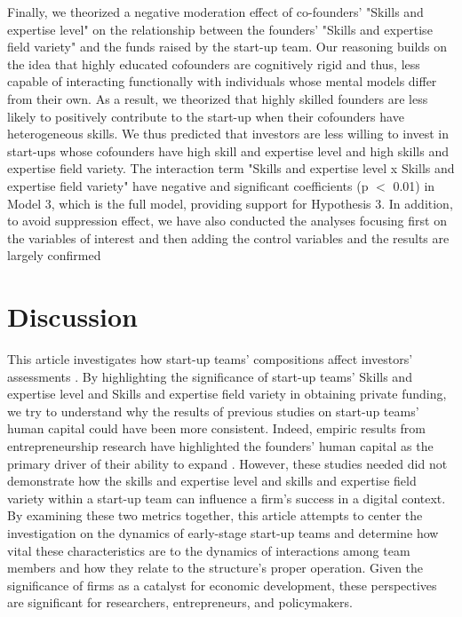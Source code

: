 \documentclass[12pt]{article}
\begin{document}
Finally, we theorized a negative moderation effect of co-founders’ "Skills and expertise level" on the relationship between the founders’ "Skills and expertise field variety" and the funds raised by the start-up team. Our reasoning builds on the idea that highly educated cofounders are cognitively rigid and thus, less capable of interacting functionally with individuals whose mental models differ from their own. As a result, we theorized that highly skilled founders are less likely to positively contribute to the start-up when their cofounders have heterogeneous skills. We thus predicted that investors are less willing to invest in start-ups whose cofounders have high skill and expertise level and high skills and expertise field variety. The interaction term "Skills and expertise level x Skills and expertise field variety" have negative and significant coefficients (p $<$ 0.01) in Model 3, which is the full model, providing support for Hypothesis 3. In addition, to avoid suppression effect, we have also conducted the analyses focusing first on the variables of interest and then adding the control variables and the results are largely confirmed

\section{Discussion}

This article investigates how start-up teams' compositions affect investors' assessments \citep{knight2020start}. By highlighting the significance of start-up teams' Skills and expertise level and Skills and expertise field variety in obtaining private funding, we try to understand why the results of previous studies on start-up teams' human capital could have been more consistent. Indeed, empiric results from entrepreneurship research have highlighted the founders' human capital as the primary driver of their ability to expand \citep{beckman2007early, plummer2016better}. However, these studies needed did not demonstrate how the skills and expertise level and skills and expertise field variety within a start-up team can influence a firm's success in a digital context. By examining these two metrics together, this article attempts to center the investigation on the dynamics of early-stage start-up teams and determine how vital these characteristics are to the dynamics of interactions among team members and how they relate to the structure's proper operation. Given the significance of firms as a catalyst for economic development, these perspectives are significant for researchers, entrepreneurs, and policymakers.
\end{document}
